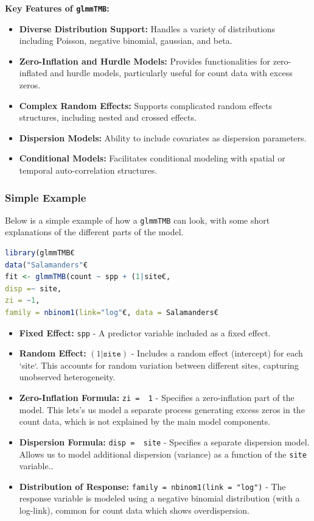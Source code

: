 \documentclass[12pt, twoside,hidelinks]{article}
\theoremstyle{definition}
\numberwithin{equation}{section}
\begin{document}
\textbf{Key Features of \texttt{glmmTMB}:}
\begin{itemize}
    \item \textbf{Diverse Distribution Support:} Handles a variety of distributions including Poisson, negative binomial, gaussian, and beta.
    \item \textbf{Zero-Inflation and Hurdle Models:} Provides functionalities for zero-inflated and hurdle models, particularly useful for count data with excess zeros.
    \item \textbf{Complex Random Effects:} Supports complicated random effects structures, including nested and crossed effects.
    \item \textbf{Dispersion Models:} Ability to include covariates as dispersion parameters.
    \item \textbf{Conditional Models:} Facilitates conditional modeling with spatial or temporal auto-correlation structures.
\end{itemize}

\subsubsection{Simple Example}\label{sec:rpack:glmmTMB:ex}

Below is a simple example of how a \texttt{glmmTMB} can look, with some short explanations of the different parts of the model.

\begin{lstlisting}[language=R]
library(glmmTMB€
data("Salamanders"€
fit <- glmmTMB(count ~ spp + (1|site€,
disp =~ site,
zi = ~1, 
family = nbinom1(link="log"€, data = Salamanders€
\end{lstlisting}

\begin{itemize}
    \item \textbf{Fixed Effect:} \texttt{spp} - A predictor variable included as a fixed effect.
    
    \item \textbf{Random Effect:} $(1|\texttt{site})$ - Includes a random effect (intercept) for each `site`. This accounts for random variation between different sites, capturing unobserved heterogeneity.
    
    \item \textbf{Zero-Inflation Formula:} \texttt{zi =~ 1} - Specifies a zero-inflation part of the model. This lets's us model a separate process generating excess zeros in the count data, which is not explained by the main model components.

    \item \textbf{Dispersion Formula:} \texttt{disp =~ site} - Specifies a separate dispersion model. Allows us to model additional dispersion (variance) as a function of the \texttt{site} variable..
    
    \item \textbf{Distribution of Response:} \texttt{family = nbinom1(link = "log")} - The response variable is modeled using a negative binomial distribution (with a log-link), common for count data which shows overdispersion.
\end{itemize}
\end{document}
